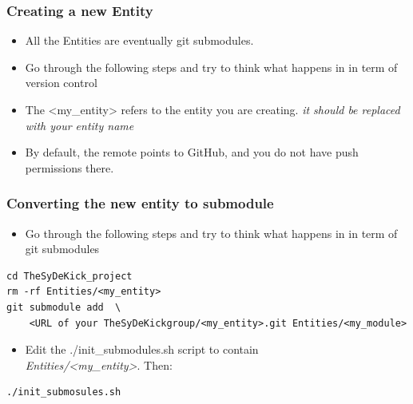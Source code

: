 \documentclass[logo=bluequo,normaltitle]{aaltoslides}
\begin{document}
\begin{frame}[t,fragile]
    \frametitle{Creating a new Entity} 
    \begin{itemize}
        \item All the Entities are eventually git submodules.
        \item Go through the following steps and try to think what happens in
            in term of version control
        \item The <my\_entity> refers to the entity you are creating. \emph{it should be
            replaced with your entity name}
        \item By default, the remote points to GitHub, and you do not have
            push permissions there.
        \end{itemize}
\end{frame}

\begin{frame}[t,fragile]
    \frametitle{Converting the new entity to submodule} 
    \begin{itemize}
        \item Go through the following steps and try to think what happens in
            in term of git submodules
    \end{itemize}
\begin{lstlisting}
cd TheSyDeKick_project
rm -rf Entities/<my_entity>
git submodule add  \
    <URL of your TheSyDeKickgroup/<my_entity>.git Entities/<my_module>
\end{lstlisting}
    \begin{itemize}
        \item Edit the ./init\_submodules.sh script to contain\\
            \emph{Entities/<my\_entity>}. Then:
    \end{itemize}
\begin{lstlisting}
./init_submosules.sh
\end{lstlisting}
\end{frame}
\end{document}
